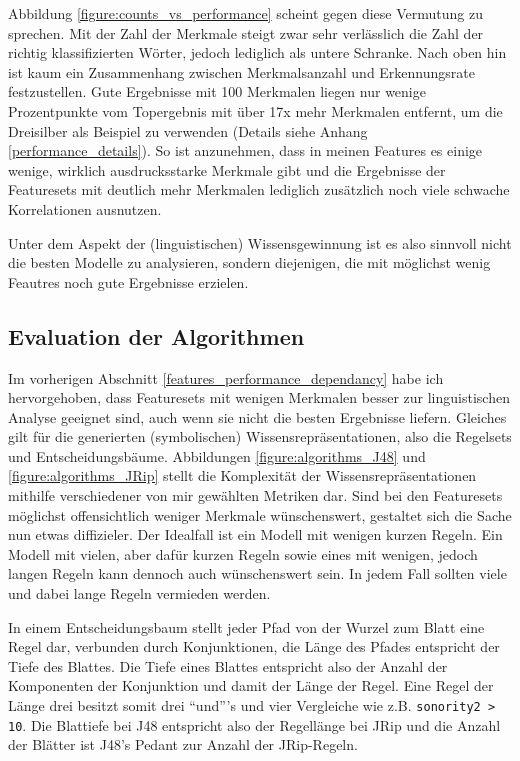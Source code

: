 Abbildung \ref{figure:counts_vs_performance} scheint gegen diese Vermutung zu sprechen. Mit der Zahl der Merkmale steigt zwar sehr verlässlich die Zahl der richtig klassifizierten Wörter, jedoch lediglich als untere Schranke. Nach oben hin ist kaum ein Zusammenhang zwischen Merkmalsanzahl und Erkennungsrate festzustellen. Gute Ergebnisse mit 100 Merkmalen liegen nur wenige Prozentpunkte vom Topergebnis mit über 17x mehr Merkmalen entfernt, um die Dreisilber als Beispiel zu verwenden (Details siehe Anhang \ref{performance_details}). So ist anzunehmen, dass in meinen Features es einige wenige, wirklich ausdrucksstarke Merkmale gibt und die Ergebnisse der Featuresets mit deutlich mehr Merkmalen lediglich zusätzlich noch viele schwache Korrelationen ausnutzen.

Unter dem Aspekt der (linguistischen) Wissensgewinnung ist es also sinnvoll nicht die besten Modelle zu analysieren, sondern diejenigen, die mit möglichst wenig Feautres noch gute Ergebnisse erzielen.

\subsection{Evaluation der Algorithmen}
Im vorherigen Abschnitt \ref{features_performance_dependancy} habe ich hervorgehoben, dass Featuresets mit wenigen Merkmalen besser zur linguistischen Analyse geeignet sind, auch wenn sie nicht die besten Ergebnisse liefern. Gleiches gilt für die generierten (symbolischen) Wissensrepräsentationen, also die Regelsets und Entscheidungsbäume. Abbildungen \ref{figure:algorithms_J48} und \ref{figure:algorithms_JRip} stellt die Komplexität der Wissensrepräsentationen mithilfe verschiedener von mir gewählten Metriken dar. Sind bei den Featuresets möglichst offensichtlich weniger Merkmale wünschenswert, gestaltet sich die Sache nun etwas diffizieler. Der Idealfall ist ein Modell mit wenigen kurzen Regeln. Ein Modell mit vielen, aber dafür kurzen Regeln sowie eines mit wenigen, jedoch langen Regeln kann dennoch auch wünschenswert sein. In jedem Fall sollten viele und dabei lange Regeln vermieden werden. 

In einem Entscheidungsbaum stellt jeder Pfad von der Wurzel zum Blatt eine Regel dar, verbunden durch Konjunktionen, die Länge des Pfades entspricht der Tiefe des Blattes. Die Tiefe eines Blattes entspricht also der Anzahl der Komponenten der Konjunktion und damit der Länge der Regel. Eine Regel der Länge drei besitzt somit drei \enquote{und}'s und vier Vergleiche wie z.B. \texttt{sonority2 > 10}. Die Blattiefe bei J48 entspricht also der Regellänge bei JRip und die Anzahl der Blätter ist J48's Pedant zur Anzahl der JRip-Regeln. 

